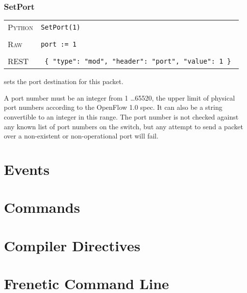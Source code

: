 \subsubsection{SetPort}

\bigskip
\begin{tabularx}{\linewidth}{lX}
\textsc{Python}   & \texttt{SetPort(1)} \\ \\
\textsc{Raw}    & \texttt{port := 1}     \\ \\
\textsc{REST} & \texttt{ \{ "type": "mod", "header": "port", "value": 1 \} }
\end{tabularx}

 sets the port destination for this packet.      

A port number must be an integer from
1 \ldots 65520, the upper limit of physical port numbers according to the OpenFlow 1.0 spec.  It can also be 
a string convertible to an integer in this range.  The port number is not checked against any known list
of port numbers on the switch, but any attempt to send a packet over a non-existent or non-operational
port will fail.  

\section{Events}

\section{Commands}

\section{Compiler Directives}

\section{Frenetic Command Line}

